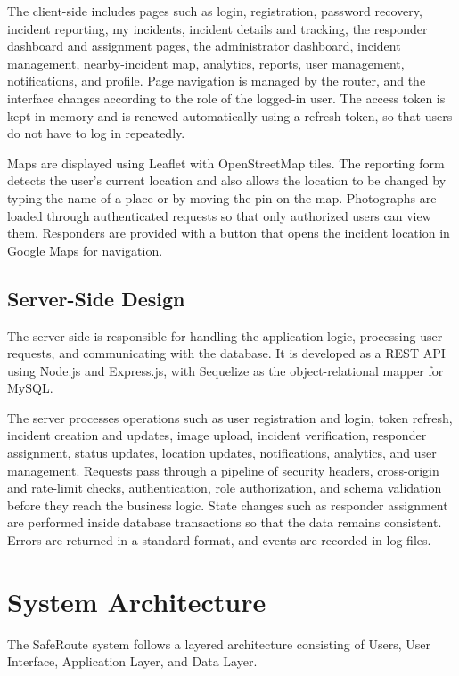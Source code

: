 \documentclass[a4paper,12pt]{report}
\begin{document}
	The client-side includes pages such as login, registration, password recovery, incident reporting, my incidents, incident details and tracking, the responder dashboard and assignment pages, the administrator dashboard, incident management, nearby-incident map, analytics, reports, user management, notifications, and profile. Page navigation is managed by the router, and the interface changes according to the role of the logged-in user. The access token is kept in memory and is renewed automatically using a refresh token, so that users do not have to log in repeatedly.
	
	Maps are displayed using Leaflet with OpenStreetMap tiles. The reporting form detects the user's current location and also allows the location to be changed by typing the name of a place or by moving the pin on the map. Photographs are loaded through authenticated requests so that only authorized users can view them. Responders are provided with a button that opens the incident location in Google Maps for navigation.
	
	\subsection{Server-Side Design}
	The server-side is responsible for handling the application logic, processing user requests, and communicating with the database. It is developed as a REST API using Node.js and Express.js, with Sequelize as the object-relational mapper for MySQL.
	
	The server processes operations such as user registration and login, token refresh, incident creation and updates, image upload, incident verification, responder assignment, status updates, location updates, notifications, analytics, and user management. Requests pass through a pipeline of security headers, cross-origin and rate-limit checks, authentication, role authorization, and schema validation before they reach the business logic. State changes such as responder assignment are performed inside database transactions so that the data remains consistent. Errors are returned in a standard format, and events are recorded in log files.
	
	\section{System Architecture}
	The SafeRoute system follows a layered architecture consisting of Users, User Interface, Application Layer, and Data Layer.
	
\end{document}
